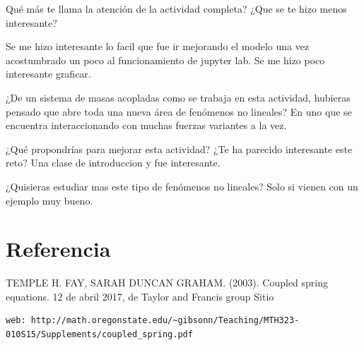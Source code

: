 \documentclass[a4paper]{article}
\begin{document}
\newpage

    Qué más te llama la atención de la actividad completa? ¿Que se te hizo menos interesante?
    \linebreak
    
    Se me hizo interesante lo facil que fue ir mejorando el modelo una vez acostumbrado  un poco al funcionamiento de jupyter lab. Se me hizo poco interesante graficar.
    \linebreak
    
    ¿De un sistema de masas acopladas como se trabaja en esta actividad, hubieras pensado que abre toda una nueva área de fenómenos no lineales?
    \linebreak
    En uno que se encuentra interaccionando con muchas fuerzas variantes a la vez.
    \linebreak
    
    ¿Qué propondrías para mejorar esta actividad? ¿Te ha parecido interesante este reto?
    \linebreak
    Una clase de introduccion y fue interesante.
    \linebreak
    
    ¿Quisieras estudiar mas este tipo de fenómenos no lineales?
    \linebreak
    Solo si vienen con un ejemplo muy bueno.
    
\section{Referencia}

TEMPLE H. FAY, SARAH DUNCAN GRAHAM. (2003). Coupled spring equations. 12 de abril 2017, de Taylor and Francis group Sitio 
\begin{verbatim}
web: http://math.oregonstate.edu/~gibsonn/Teaching/MTH323-010S15/Supplements/coupled_spring.pdf

\end{verbatim}


 
\end{document}
